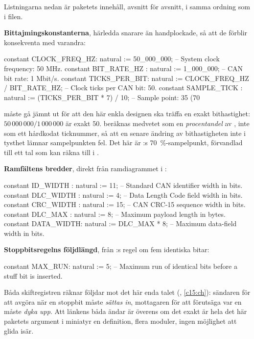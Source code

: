 Listningarna nedan är paketets innehåll, avsnitt för avsnitt, i samma ordning som i filen.

\textbf{Bittajmingskonstanterna}, härledda snarare än handplockade, så att de förblir konsekventa med
varandra:

\begin{vhdlcode}
constant CLOCK_FREQ_HZ: natural := 50_000_000;                  -- System clock frequency: 50 MHz.
constant BIT_RATE_HZ  : natural := 1_000_000;                   -- CAN bit rate: 1 Mbit/s.
constant TICKS_PER_BIT: natural := CLOCK_FREQ_HZ / BIT_RATE_HZ; -- Clock ticks per CAN bit: 50.
constant SAMPLE_TICK  : natural := (TICKS_PER_BIT * 7) / 10;    -- Sample point: 35 (70%
\end{vhdlcode}

 måste gå jämnt ut för att den här enkla designen ska träffa en exakt
bithastighet: $50\,000\,000 / 1\,000\,000$ är exakt 50.  beräknas medvetet som en
\emph{procentandel} av , inte som ett hårdkodat ticknummer, så att en senare
ändring av bithastigheten inte i tysthet lämnar sampelpunkten fel. Det här är
:s 70~\%-sampelpunkt, förvandlad till ett tal som  kan
räkna till i .

\textbf{Ramfältens bredder}, direkt från ramdiagrammet i :

\begin{vhdlcode}
constant ID_WIDTH  : natural := 11;          -- Standard CAN identifier width in bits.
constant DLC_WIDTH : natural := 4;           -- Data Length Code field width in bits.
constant CRC_WIDTH : natural := 15;          -- CAN CRC-15 sequence width in bits.
constant DLC_MAX   : natural := 8;           -- Maximum payload length in bytes.
constant DATA_WIDTH: natural := DLC_MAX * 8; -- Maximum data-field width in bits.
\end{vhdlcode}

\textbf{Stoppbitsregelns följdlängd}, från :s regel om fem identiska bitar:

\begin{vhdlcode}
constant MAX_RUN: natural := 5; -- Maximum run of identical bits before a stuff bit is inserted.
\end{vhdlcode}

Båda skiftregistren räknar följdar mot det här enda talet (, \ref{c15:ch}): sändaren
för att avgöra när en stoppbit måste \emph{sättas in}, mottagaren för att förutsäga var en måste
\emph{dyka upp}. Att länkens båda ändar är överens om det exakt är hela det här paketets argument i
miniatyr \textemdash{} en definition, flera moduler, ingen möjlighet att glida isär.

